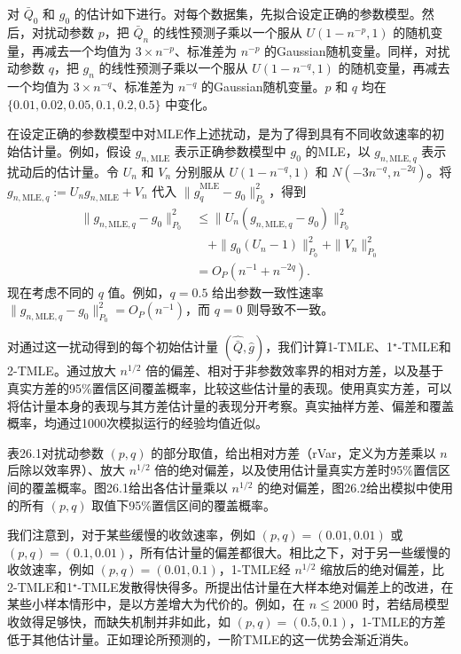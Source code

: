 对 $\bar Q_0$ 和 $g_0$ 的估计如下进行。对每个数据集，先拟合设定正确的参数模型。然后，对扰动参数 $p$，把 $\bar Q_n$ 的线性预测子乘以一个服从 $U(1-n^{-p},1)$ 的随机变量，再减去一个均值为 $3\times n^{-p}$、标准差为 $n^{-p}$ 的Gaussian随机变量。同样，对扰动参数 $q$，把 $g_n$ 的线性预测子乘以一个服从 $U(1-n^{-q},1)$ 的随机变量，再减去一个均值为 $3\times n^{-q}$、标准差为 $n^{-q}$ 的Gaussian随机变量。$p$ 和 $q$ 均在 $\{0.01,0.02,0.05,0.1,0.2,0.5\}$ 中变化。

在设定正确的参数模型中对MLE作上述扰动，是为了得到具有不同收敛速率的初始估计量。例如，假设 $g_{n,\mathrm{MLE}}$ 表示正确参数模型中 $g_0$ 的MLE，以 $g_{n,\mathrm{MLE},q}$ 表示扰动后的估计量。令 $U_n$ 和 $V_n$ 分别服从 $U(1-n^{-q},1)$ 和 $N(-3n^{-q},n^{-2q})$。将 $g_{n,\mathrm{MLE},q}:=U_ng_{n,\mathrm{MLE}}+V_n$ 代入 $\|\hat g_q^{\mathrm{MLE}}-g_0\|_{P_0}^2$，得到
\[
\begin{aligned}
\|g_{n,\mathrm{MLE},q}-g_0\|_{P_0}^2
&\le\|U_n(g_{n,\mathrm{MLE},q}-g_0)\|_{P_0}^2\\
&\quad+\|g_0(U_n-1)\|_{P_0}^2+\|V_n\|_{P_0}^2\\
&=O_P(n^{-1}+n^{-2q}).
\end{aligned}
\]
现在考虑不同的 $q$ 值。例如，$q=0.5$ 给出参数一致性速率 $\|g_{n,\mathrm{MLE},q}-g_0\|_{P_0}^2=O_P(n^{-1})$，而 $q=0$ 则导致不一致。

对通过这一扰动得到的每个初始估计量 $(\hat{\bar Q},\hat g)$，我们计算1-TMLE、1$^\star$-TMLE和2-TMLE。通过放大 $n^{1/2}$ 倍的偏差、相对于非参数效率界的相对方差，以及基于真实方差的95\%置信区间覆盖概率，比较这些估计量的表现。使用真实方差，可以将估计量本身的表现与其方差估计量的表现分开考察。真实抽样方差、偏差和覆盖概率，均通过1000次模拟运行的经验均值近似。

表26.1对扰动参数 $(p,q)$ 的部分取值，给出相对方差（rVar，定义为方差乘以 $n$ 后除以效率界）、放大 $n^{1/2}$ 倍的绝对偏差，以及使用估计量真实方差时95\%置信区间的覆盖概率。图26.1给出各估计量乘以 $n^{1/2}$ 的绝对偏差，图26.2给出模拟中使用的所有 $(p,q)$ 取值下95\%置信区间的覆盖概率。

我们注意到，对于某些缓慢的收敛速率，例如 $(p,q)=(0.01,0.01)$ 或 $(p,q)=(0.1,0.01)$，所有估计量的偏差都很大。相比之下，对于另一些缓慢的收敛速率，例如 $(p,q)=(0.01,0.1)$，1-TMLE经 $n^{1/2}$ 缩放后的绝对偏差，比2-TMLE和1$^\star$-TMLE发散得快得多。所提出估计量在大样本绝对偏差上的改进，在某些小样本情形中，是以方差增大为代价的。例如，在 $n\le2000$ 时，若结局模型收敛得足够快，而缺失机制并非如此，如 $(p,q)=(0.5,0.1)$，1-TMLE的方差低于其他估计量。正如理论所预测的，一阶TMLE的这一优势会渐近消失。

